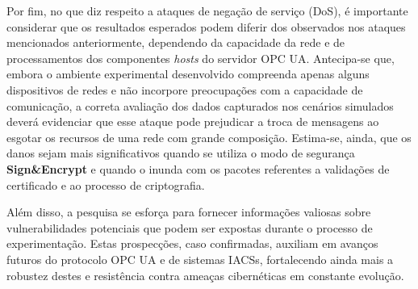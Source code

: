 Por fim, no que diz respeito a ataques de negação de serviço (DoS), é importante considerar que os resultados esperados podem diferir dos observados nos ataques mencionados anteriormente, dependendo da capacidade da rede e de processamentos dos componentes \textit{hosts} do servidor OPC UA. Antecipa-se que, embora o ambiente experimental desenvolvido compreenda apenas alguns dispositivos de redes e não incorpore preocupações com a capacidade de comunicação, a correta avaliação dos dados capturados nos cenários simulados deverá evidenciar que esse ataque pode prejudicar a troca de mensagens ao esgotar os recursos de uma rede com grande composição. Estima-se, ainda, que os danos sejam mais significativos quando se utiliza o modo de segurança \textbf{Sign\&Encrypt} e quando o inunda com os pacotes referentes a validações de certificado e ao processo de criptografia.

Além disso, a pesquisa se esforça para fornecer informações valiosas sobre vulnerabilidades potenciais que podem ser expostas durante o processo de experimentação. Estas prospecções, caso confirmadas, auxiliam em avanços futuros do protocolo OPC UA e de sistemas IACSs, fortalecendo ainda mais a robustez destes e resistência contra ameaças cibernéticas em constante evolução.

